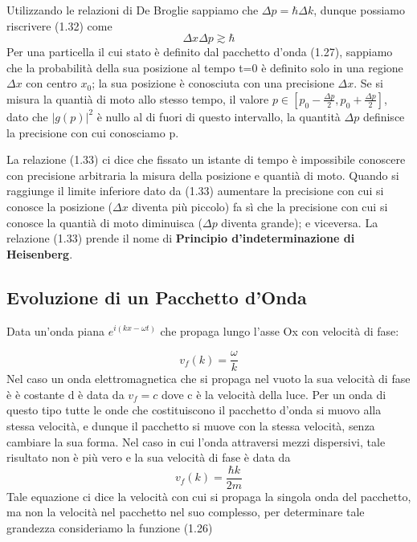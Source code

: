 \noindent Utilizzando le relazioni di De Broglie sappiamo che $\Delta p = \hbar \Delta k$, dunque possiamo riscrivere (1.32) come
\begin{equation}
	\Delta x \Delta p \gtrsim \hbar 
\end{equation}
\newpage 
\noindent Per una particella il cui stato \`e definito dal pacchetto d'onda (1.27), sappiamo che la probabilit\`a della sua posizione al tempo t=0 \`e definito solo in una regione $\Delta x$ con centro $x_0$; la sua posizione \`e conosciuta con una precisione $\Delta x$. Se si misura la quanti\`a di moto allo stesso tempo, il valore $p \in \left [p_0 - \frac{\Delta p}{2}, p_0 + \frac{\Delta p}{2} \right ]$, dato che $|g(p)|^2$ \`e nullo al di fuori di questo intervallo, la quantit\`a $\Delta p$ definisce la precisione con cui conosciamo p. 

\noindent La relazione (1.33) ci dice che fissato un istante di tempo \`e impossibile conoscere con precisione arbitraria la misura della posizione e quanti\`a di moto. Quando si raggiunge il limite inferiore dato da (1.33) aumentare la precisione con cui si conosce la posizione ($\Delta x$ diventa pi\`u piccolo) fa s\`i che la precisione con cui si conosce la quanti\`a di moto diminuisca ($\Delta p $ diventa grande); e viceversa. La relazione (1.33) prende il nome di \textbf{Principio d'indeterminazione di Heisenberg}.

\subsection{Evoluzione di un Pacchetto d'Onda}

Data un'onda piana $e^{i(kx-\omega t)}$ che propaga lungo l'asse Ox con velocit\`a di fase:

\begin{equation*}
	v_f(k) = \frac{\omega}{k}
\end{equation*}
Nel caso un onda elettromagnetica che si propaga nel vuoto la sua velocit\`a di fase \`e \`e costante d \`e data da $v_f = c $ dove c \`e la velocit\`a della luce. Per un onda di questo tipo tutte le onde che costituiscono il pacchetto d'onda si muovo alla stessa velocit\`a, e dunque il pacchetto si muove con la stessa velocit\`a, senza cambiare la sua forma. Nel caso in cui l'onda attraversi mezzi dispersivi, tale risultato non \`e pi\`u vero e la sua velocit\`a di fase \`e data da 
\begin{equation*}
	v_f(k) = \frac{\hbar k}{2m}
\end{equation*}
Tale equazione ci dice la velocit\`a con cui si propaga la singola onda del pacchetto, ma non la velocit\`a nel pacchetto nel suo complesso, per determinare tale grandezza consideriamo la funzione (1.26)


